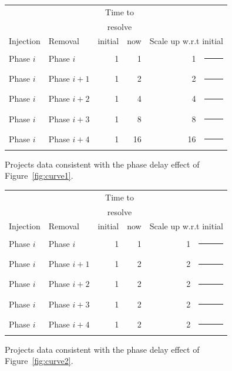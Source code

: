 \documentclass{sig-alternate}
\newcommand{\fig}[1]{Figure~\ref{fig:#1}}
\begin{document}
\begin{figure}[!t]
\scriptsize
\begin{center}
\begin{tabular}{l@{~}|l@{~}|r@{~}r@{~}|r@{~}l}
          &        & \multicolumn{2}{c|}{Time to}  &\\
          &        & \multicolumn{2}{c|}{resolve} &\\
Injection & Removal& initial & now & \multicolumn{2}{l}{Scale up w.r.t initial} \\\hline
Phase $i$&Phase $i$ & 1 & 1 & 1 &\rule{2mm}{2mm} \\
Phase $i$ &Phase $i+1$ & 1 & 2& 2 &\rule{4mm}{2mm} \\
Phase $i$ &Phase $i+2$ & 1 & 4& 4 &\rule{8mm}{2mm} \\
Phase $i$ &Phase $i+3$ & 1 & 8 & 8 & \rule{16mm}{2mm} \\
 Phase $i$  &Phase $i+4$ &1 & 16 & 16 &\rule{32mm}{2mm} 
  \end{tabular}\end{center}
 \caption{Projects data consistent with
 the phase delay effect of \fig{curve1}.}\label{fig:curve1a}
\end{figure}

\begin{figure}[!t]
\scriptsize
\begin{center}
\begin{tabular}{l@{~}|l@{~}|r@{~}r@{~}|r@{~}l}
          &        & \multicolumn{2}{c|}{Time to}  &\\
          &        & \multicolumn{2}{c|}{resolve} &\\
Injection & Removal& initial & now & \multicolumn{2}{l}{Scale up w.r.t initial} \\\hline
Phase $i$&Phase $i$ & 1 & 1 & 1 &\rule{2mm}{2mm} \\
Phase $i$ &Phase $i+1$ & 1 & 2& 2 &\rule{4mm}{2mm} \\
Phase $i$ &Phase $i+2$ & 1 & 2& 2 &\rule{4mm}{2mm} \\
Phase $i$ &Phase $i+3$ & 1 & 2 & 2 & \rule{4mm}{2mm} \\
 Phase $i$  &Phase $i+4$ &1 & 2& 2 &\rule{4mm}{2mm} 
  \end{tabular}\end{center}
 \caption{Projects data consistent with
 the phase delay effect of \fig{curve2}.}\label{fig:curve2a}
\end{figure}
 
\end{document}
